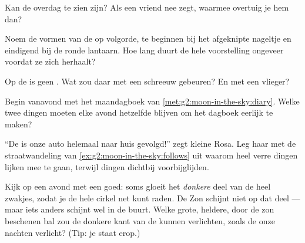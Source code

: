 \begin{exercise}[$\star$]\label{exo:g2:moon-in-the-sky:5}
Kan de  overdag te zien zijn? Als een vriend nee zegt, waarmee
overtuig je hem dan?
\end{exercise}

\begin{exercise}[$\star$]\label{exo:g2:moon-in-the-sky:6}
Noem de vormen van de  op volgorde, te beginnen bij het afgeknipte
nageltje en eindigend bij de ronde lantaarn. Hoe lang duurt de hele
voorstelling ongeveer voordat ze zich herhaalt?
\end{exercise}

\begin{exercise}[$\star$]\label{exo:g2:moon-in-the-sky:7}
Op de  is geen . Wat zou daar met een schreeuw gebeuren? En
met een vlieger?
\end{exercise}

\begin{exercise}[$\star$]\label{exo:g2:moon-in-the-sky:8}
Begin vanavond met het maandagboek van
\cref{met:g2:moon-in-the-sky:diary}. Welke twee dingen moeten elke
avond hetzelfde blijven om het dagboek eerlijk te maken?
\end{exercise}

\begin{exercise}[$\star\star$]\label{exo:g2:moon-in-the-sky:9}
``De  is onze auto helemaal naar huis gevolgd!'' zegt kleine Rosa.
Leg haar met de straatwandeling van
\cref{ex:g2:moon-in-the-sky:follows} uit waarom heel verre dingen
lijken mee te gaan, terwijl dingen dichtbij voorbijglijden.
\end{exercise}

\begin{exercise}[$\star\star$]\label{exo:g2:moon-in-the-sky:10}
Kijk op een avond met een  goed: soms gloeit het
\emph{donkere} deel van de  heel zwakjes, zodat je de hele cirkel
net kunt raden. De Zon schijnt niet op dat deel --- maar iets anders
schijnt wel in de buurt. Welke grote, heldere, door de zon beschenen
bal zou de donkere kant van de  kunnen verlichten, zoals de
 onze nachten verlicht? (Tip: je staat erop.)
\end{exercise}
